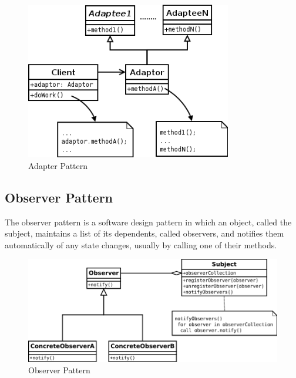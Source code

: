 \documentclass[a4paper, 12pt]{article}
\begin{document}
\begin{figure}[!h]
	\center\includegraphics[width=9cm]{figures/adapter.png}
	\caption{Adapter Pattern}
\end{figure}

	\subsection{Observer Pattern}
	
The observer pattern is a software design pattern in which an object, called the subject, maintains a list of its dependents, called observers, and notifies them automatically of any state changes, usually by calling one of their methods.

\begin{figure}[!h]
	\center\includegraphics[width=12cm]{figures/observer.png}
	\caption{Observer Pattern}
\end{figure}
\end{document}
